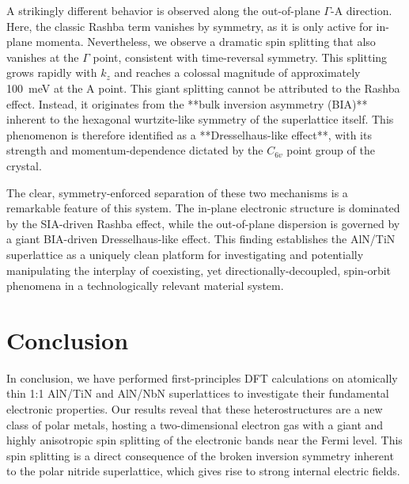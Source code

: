 \documentclass[aps,prl,reprint,superscriptaddress]{revtex4-2}
\begin{document}
A strikingly different behavior is observed along the out-of-plane $\Gamma$-A
direction. Here, the classic Rashba term vanishes by symmetry, as it is only
active for in-plane momenta. Nevertheless, we observe a dramatic spin splitting
that also vanishes at the $\Gamma$ point, consistent with time-reversal
symmetry. This splitting grows rapidly with $k_z$ and reaches a colossal
magnitude of approximately 100~meV at the A point. This giant splitting cannot
be attributed to the Rashba effect. Instead, it originates from the **bulk
inversion asymmetry (BIA)** inherent to the hexagonal wurtzite-like symmetry of
the superlattice itself. This phenomenon is therefore identified as a
**Dresselhaus-like effect**, with its strength and momentum-dependence dictated
by the $C_{6v}$ point group of the crystal.

The clear, symmetry-enforced separation of these two mechanisms is a remarkable
feature of this system. The in-plane electronic structure is dominated by the
SIA-driven Rashba effect, while the out-of-plane dispersion is governed by a
giant BIA-driven Dresselhaus-like effect. This finding establishes the AlN/TiN
superlattice as a uniquely clean platform for investigating and potentially
manipulating the interplay of coexisting, yet directionally-decoupled,
spin-orbit phenomena in a technologically relevant material system.




\section{Conclusion} In conclusion, we have performed first-principles DFT
calculations on atomically thin 1:1 AlN/TiN and AlN/NbN superlattices to
investigate their fundamental electronic properties. Our results reveal that
these heterostructures are a new class of polar metals, hosting a
two-dimensional electron gas with a giant and highly anisotropic spin splitting
of the electronic bands near the Fermi level. This spin splitting is a direct
consequence of the broken inversion symmetry inherent to the polar nitride
superlattice, which gives rise to strong internal electric fields.
\end{document}
